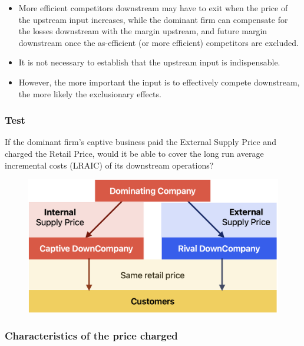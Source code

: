 
            \begin{itemize}
                \item More efficient competitors downstream may have to exit when the price of the upstream input increases, while the dominant firm can compensate for the losses downstream with the margin upstream, and future margin downstream once the as-efficient (or more efficient) competitors are excluded.
                \item It is not necessary to establish that the upstream input is indispensable.
                \item However, the more important the input is to effectively compete downstream, the more likely the exclusionary effects.
            \end{itemize}


        \subsubsection{Test}

            If the dominant firm’s captive business paid the External Supply Price and charged the Retail Price, would it be able to cover the long run average incremental costs (LRAIC) of its downstream operations?

            \begin{figure}[ht]
                \centering
                \includegraphics[width=0.5\linewidth]{graphics/L12-2.png}
            \end{figure}
            
        \subsubsection{Characteristics of the price charged} 

